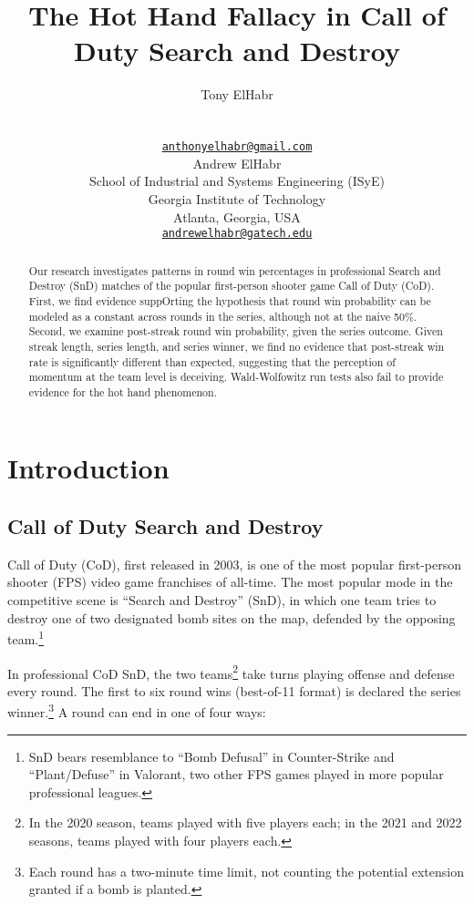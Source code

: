 \documentclass{article}
\title{The Hot Hand Fallacy in Call of Duty Search and Destroy}
\author{
    Tony ElHabr
   \\
     \\
   \\
  \texttt{\href{mailto:anthonyelhabr@gmail.com}{\nolinkurl{anthonyelhabr@gmail.com}}} \\
   \And
    Andrew ElHabr
   \\
    School of Industrial and Systems Engineering (ISyE) \\
    Georgia Institute of Technology \\
  Atlanta, Georgia, USA \\
  \texttt{\href{mailto:andrewelhabr@gatech.edu}{\nolinkurl{andrewelhabr@gatech.edu}}} \\
  }
\begin{document}
\maketitle


\begin{abstract}
Our research investigates patterns in round win percentages in
professional Search and Destroy (SnD) matches of the popular
first-person shooter game Call of Duty (CoD). First, we find evidence
suppOrting the hypothesis that round win probability can be modeled as a
constant across rounds in the series, although not at the naive 50\%.
Second, we examine post-streak round win probability, given the series
outcome. Given streak length, series length, and series winner, we find
no evidence that post-streak win rate is significantly different than
expected, suggesting that the perception of momentum at the team level
is deceiving. Wald-Wolfowitz run tests also fail to provide evidence for
the hot hand phenomenon.
\end{abstract}


\hypertarget{introduction}{%
\section{Introduction}\label{introduction}}

\hypertarget{call-of-duty-search-and-destroy}{%
\subsection{Call of Duty Search and
Destroy}\label{call-of-duty-search-and-destroy}}

Call of Duty (CoD), first released in 2003, is one of the most popular
first-person shooter (FPS) video game franchises of all-time. The most
popular mode in the competitive scene is ``Search and Destroy'' (SnD),
in which one team tries to destroy one of two designated bomb sites on
the map, defended by the opposing team.\footnote{SnD bears resemblance
  to ``Bomb Defusal'' in Counter-Strike and ``Plant/Defuse'' in
  Valorant, two other FPS games played in more popular professional
  leagues.}

In professional CoD SnD, the two teams\footnote{In the 2020 season,
  teams played with five players each; in the 2021 and 2022 seasons,
  teams played with four players each.} take turns playing offense and
defense every round. The first to six round wins (best-of-11 format) is
declared the series winner.\footnote{Each round has a two-minute time
  limit, not counting the potential extension granted if a bomb is
  planted.} A round can end in one of four ways:
\end{document}
